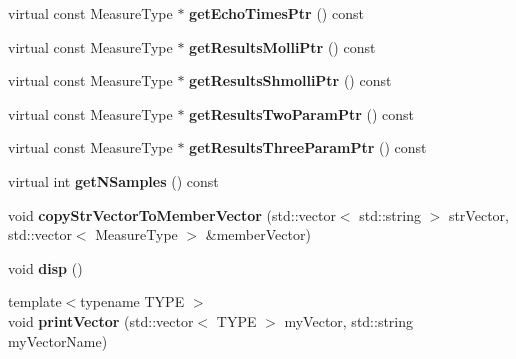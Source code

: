 \begin{DoxyCompactItemize}
\item 
\hypertarget{class_ox_1_1_test_data_afff44a9b347b3d1113befa1e6c7fcfad}{virtual const Measure\-Type $\ast$ {\bfseries get\-Echo\-Times\-Ptr} () const }\label{class_ox_1_1_test_data_afff44a9b347b3d1113befa1e6c7fcfad}

\item 
\hypertarget{class_ox_1_1_test_data_a1cb0dc25db322b7ba075e0ab7f5d6567}{virtual const Measure\-Type $\ast$ {\bfseries get\-Results\-Molli\-Ptr} () const }\label{class_ox_1_1_test_data_a1cb0dc25db322b7ba075e0ab7f5d6567}

\item 
\hypertarget{class_ox_1_1_test_data_ad822f6946548df6c68cf6cb007030702}{virtual const Measure\-Type $\ast$ {\bfseries get\-Results\-Shmolli\-Ptr} () const }\label{class_ox_1_1_test_data_ad822f6946548df6c68cf6cb007030702}

\item 
\hypertarget{class_ox_1_1_test_data_a941d1027bc1ee142c5cf8ef1dbbefa7e}{virtual const Measure\-Type $\ast$ {\bfseries get\-Results\-Two\-Param\-Ptr} () const }\label{class_ox_1_1_test_data_a941d1027bc1ee142c5cf8ef1dbbefa7e}

\item 
\hypertarget{class_ox_1_1_test_data_a6670e22176b7a599e2ff0e193a271d83}{virtual const Measure\-Type $\ast$ {\bfseries get\-Results\-Three\-Param\-Ptr} () const }\label{class_ox_1_1_test_data_a6670e22176b7a599e2ff0e193a271d83}

\item 
\hypertarget{class_ox_1_1_test_data_a93fc01cb722f3cadbaa530068c0079da}{virtual int {\bfseries get\-N\-Samples} () const }\label{class_ox_1_1_test_data_a93fc01cb722f3cadbaa530068c0079da}

\item 
\hypertarget{class_ox_1_1_test_data_a4c5bb0b0296218d61c608a8592900c39}{void {\bfseries copy\-Str\-Vector\-To\-Member\-Vector} (std\-::vector$<$ std\-::string $>$ str\-Vector, std\-::vector$<$ Measure\-Type $>$ \&member\-Vector)}\label{class_ox_1_1_test_data_a4c5bb0b0296218d61c608a8592900c39}

\item 
\hypertarget{class_ox_1_1_test_data_ac19364ea614dad392eefb4dbeb8a7903}{void {\bfseries disp} ()}\label{class_ox_1_1_test_data_ac19364ea614dad392eefb4dbeb8a7903}

\item 
\hypertarget{class_ox_1_1_test_data_a3de0e44dba2bd5e3b7556d662575378a}{{\footnotesize template$<$typename T\-Y\-P\-E $>$ }\\void {\bfseries print\-Vector} (std\-::vector$<$ T\-Y\-P\-E $>$ my\-Vector, std\-::string my\-Vector\-Name)}\label{class_ox_1_1_test_data_a3de0e44dba2bd5e3b7556d662575378a}

\end{DoxyCompactItemize}
